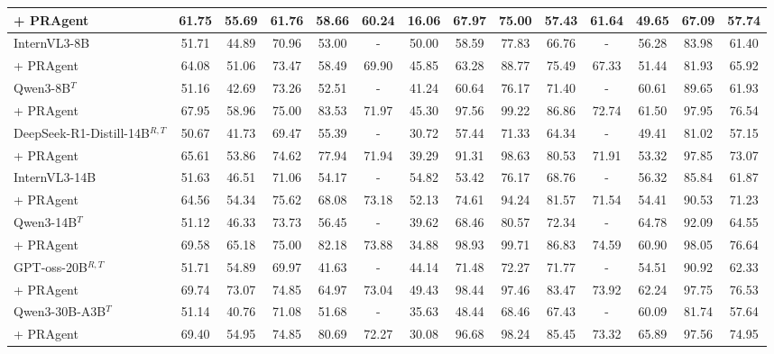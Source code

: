 \begin{table*}[t!]
{\begin{tabular}{l|cc|cccccc|cccc|c}
\rowcolor[rgb]{0.928, 0.936, 0.997}
+ PRAgent & 61.75 & 55.69 & 61.76 & 58.66 & 60.24 & 16.06 & 67.97 & 75.00 & 57.43 & 61.64 & 49.65 & 67.09 & 57.74 \\
\midrule
InternVL3-8B & 51.71 & 44.89 & 70.96 & 53.00 & - & 50.00 & 58.59 & 77.83 & 66.76 & - & 56.28 & 83.98 & 61.40 \\
\rowcolor[rgb]{0.928, 0.936, 0.997}
+ PRAgent & 64.08 & 51.06 & 73.47 & 58.49 & 69.90 & 45.85 & 63.28 & 88.77 & 75.49 & 67.33 & 51.44 & 81.93 & 65.92 \\
\midrule
Qwen3-8B$^{T}$ & 51.16 & 42.69 & 73.26 & 52.51 & - & 41.24 & 60.64 & 76.17 & 71.40 & - & 60.61 & 89.65 & 61.93 \\
\rowcolor[rgb]{0.928, 0.936, 0.997}
+ PRAgent & 67.95 & 58.96 & 75.00 & 83.53 & 71.97 & 45.30 & 97.56 & 99.22 & 86.86 & 72.74 & 61.50 & 97.95 & 76.54 \\
\midrule
DeepSeek-R1-Distill-14B$^{R,T}$ & 50.67 & 41.73 & 69.47 & 55.39 & - & 30.72 & 57.44 & 71.33 & 64.34 & - & 49.41 & 81.02 & 57.15 \\
\rowcolor[rgb]{0.928, 0.936, 0.997}
+ PRAgent & 65.61 & 53.86 & 74.62 & 77.94 & 71.94 & 39.29 & 91.31 & 98.63 & 80.53 & 71.91 & 53.32 & 97.85 & 73.07 \\
\midrule
InternVL3-14B & 51.63 & 46.51 & 71.06 & 54.17 & - & 54.82 & 53.42 & 76.17 & 68.76 & - & 56.32 & 85.84 & 61.87 \\
\rowcolor[rgb]{0.928, 0.936, 0.997}
+ PRAgent & 64.56 & 54.34 & 75.62 & 68.08 & 73.18 & 52.13 & 74.61 & 94.24 & 81.57 & 71.54 & 54.41 & 90.53 & 71.23 \\
\midrule
Qwen3-14B$^{T}$ & 51.12 & 46.33 & 73.73 & 56.45 & - & 39.62 & 68.46 & 80.57 & 72.34 & - & 64.78 & 92.09 & 64.55 \\
\rowcolor[rgb]{0.928, 0.936, 0.997}
+ PRAgent & 69.58 & 65.18 & 75.00 & 82.18 & 73.88 & 34.88 & 98.93 & 99.71 & 86.83 & 74.59 & 60.90 & 98.05 & 76.64 \\
\midrule
GPT-oss-20B$^{R,T}$ & 51.71 & 54.89 & 69.97 & 41.63 & - & 44.14 & 71.48 & 72.27 & 71.77 & - & 54.51 & 90.92 & 62.33 \\
\rowcolor[rgb]{0.928, 0.936, 0.997}
+ PRAgent & 69.74 & 73.07 & 74.85 & 64.97 & 73.04 & 49.43 & 98.44 & 97.46 & 83.47 & 73.92 & 62.24 & 97.75 & 76.53 \\
\midrule
Qwen3-30B-A3B$^{T}$ & 51.14 & 40.76 & 71.08 & 51.68 & - & 35.63 & 48.44 & 68.46 & 67.43 & - & 60.09 & 81.74 & 57.64 \\
\rowcolor[rgb]{0.928, 0.936, 0.997}
+ PRAgent & 69.40 & 54.95 & 74.85 & 80.69 & 72.27 & 30.08 & 96.68 & 98.24 & 85.45 & 73.32 & 65.89 & 97.56 & 74.95 \\

\end{tabular}}
\end{table*}
